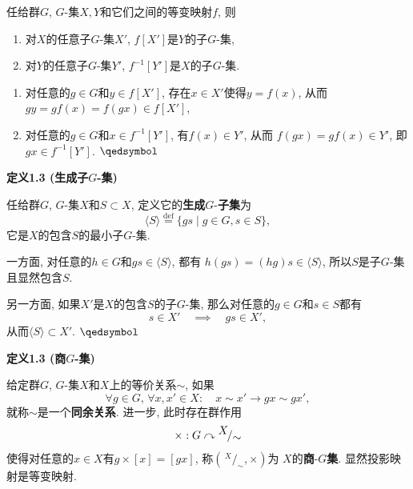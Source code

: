 \documentclass[UTF8]{ctexart}
\begin{document}
任给群$G$, $G$-集$X,Y$和它们之间的等变映射$f$, 则
\begin{enumerate}
    \item 对$X$的任意子$G$-集$X'$, $f[X']$是$Y$的子$G$-集,
    \item 对$Y$的任意子$G$-集$Y'$, $f^{-1}[Y']$是$X$的子$G$-集.
\end{enumerate}


\begin{enumerate}
    \item 对任意的$g\in G$和$y\in f[X']$, 存在$x\in X'$使得$y=f(x)$, 从而
    $gy=gf(x)=f(gx)\in f[X']$,
    \item 对任意的$g\in G$和$x\in f^{-1}[Y']$, 有$f(x)\in Y'$, 从而
    $f(gx)=gf(x)\in Y'$, 即$gx\in f^{-1}[Y']$. \hfill $\qedsymbol$
\end{enumerate}

\vspace{10pt}

\hypertarget{sec:定义1.3}{}
\noindent\textbf{定义1.3 (生成子$G$-集)}

任给群$G$, $G$-集$X$和$S\subset X$, 定义它的\textbf{生成}$G$-\textbf{子集}为
\[
    \langle S\rangle\overset{\mathrm{def}}{=}\{gs\mid g\in G,s\in S\},
\]
它是$X$的包含$S$的最小子$G$-集.


一方面, 对任意的$h\in G$和$gs\in\langle S\rangle$, 都有
$h(gs)=(hg)s\in\langle S\rangle$, 所以$S$是子$G$-集且显然包含$S$.

另一方面, 如果$X'$是$X$的包含$S$的子$G$-集, 那么对任意的$g\in G$和$s\in S$都有
\[
    s\in X'\quad\implies\quad gs\in X',
\]
从而$\langle S\rangle\subset X'$. \hfill $\qedsymbol$





\newpage

\hypertarget{sec:定义1.3}{}
\noindent\textbf{定义1.3 (商$G$-集)}

给定群$G$, $G$-集$X$和$X$上的等价关系$\sim$, 如果
\[
    \forall g\in G,\,\forall x,x'\in X:\quad x\sim x'\rightarrow gx\sim gx',
\]
就称$\sim$是一个\textbf{同余关系}. 进一步, 此时存在群作用
\[
    \times:G\curvearrowright\,\!^{\displaystyle X}\!/_{\displaystyle\sim}\\[3pt]
\]
使得对任意的$x\in X$有$g\times[x]=[gx]$,
称$\left(\,\!^{\displaystyle X}\!/_{\displaystyle\sim},\times\right)$为
$X$的\textbf{商}-$G$\textbf{集}. 显然投影映射是等变映射.

\end{document}
